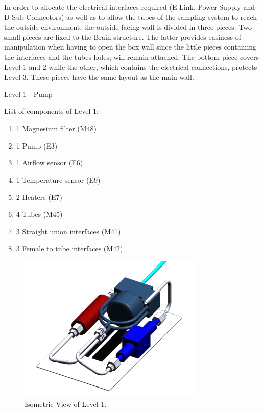 \smallskip
In order to allocate the electrical interfaces required (E-Link, Power Supply and D-Sub Connectors) as well as to allow the tubes of the sampling system to reach the outside environment, the outside facing wall is divided in three pieces. Two small pieces are fixed to the Brain structure. The latter provides easiness of manipulation when having to open the box wall since the little pieces containing the interfaces and the tubes holes, will remain attached. The bottom piece covers Level 1 and 2 while the other, which contains the electrical connections, protects Level 3. These pieces have the same layout as the main wall. 


\pagebreak
\underline{Level 1 - Pump}

\smallskip
List of components of Level 1:

\begin{enumerate}[label=\Alph*.]
    \item 1 Magnesium filter (M48)
    \item 1 Pump (E3)
    \item 1 Airflow sensor (E6)
    \item 1 Temperature sensor (E9)
    \item 2 Heaters (E7)
    \item 4 Tubes (M45)
    \item 3 Straight union interfaces (M41)
    \item 3 Female to tube interfaces (M42)
\end{enumerate}


\begin{figure}[H]
    \centering
    \includegraphics[width=0.8\textwidth]{4-experiment-design/img/Mechanical/Level_1.png}
    \caption{Isometric View of Level 1.}
    \label{level_1}
\end{figure}

